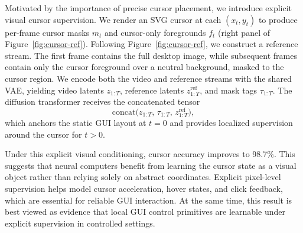 Motivated by the importance of precise cursor placement, we introduce explicit visual cursor supervision.
We render an SVG cursor at each $(x_t,y_t)$ to produce per-frame cursor masks $m_t$ and cursor-only foregrounds $f_t$ (right panel of Figure~\ref{fig:cursor-ref}).
Following Figure~\ref{fig:cursor-ref}, we construct a reference stream.
The first frame contains the full desktop image, while subsequent frames contain only the cursor foreground over a neutral background, masked to the cursor region.
We encode both the video and reference streams with the shared VAE, yielding video latents $z_{1:T}$, reference latents $z^{\text{ref}}_{1:T}$, and mask tags $\tau_{1:T}$.
The diffusion transformer receives the concatenated tensor
\[
  \mathrm{concat}\bigl(z_{1:T},\,\tau_{1:T},\,z^{\text{ref}}_{1:T}\bigr),
\]
which anchors the static GUI layout at $t{=}0$ and provides localized supervision around the cursor for $t{>}0$.

Under this explicit visual conditioning, cursor accuracy improves to 98.7\%.
This suggests that neural computers benefit from learning the cursor state as a visual object rather than relying solely on abstract coordinates.
Explicit pixel-level supervision helps model cursor acceleration, hover states, and click feedback, which are essential for reliable GUI interaction.
At the same time, this result is best viewed as evidence that local GUI control primitives are learnable under explicit supervision in controlled settings.


